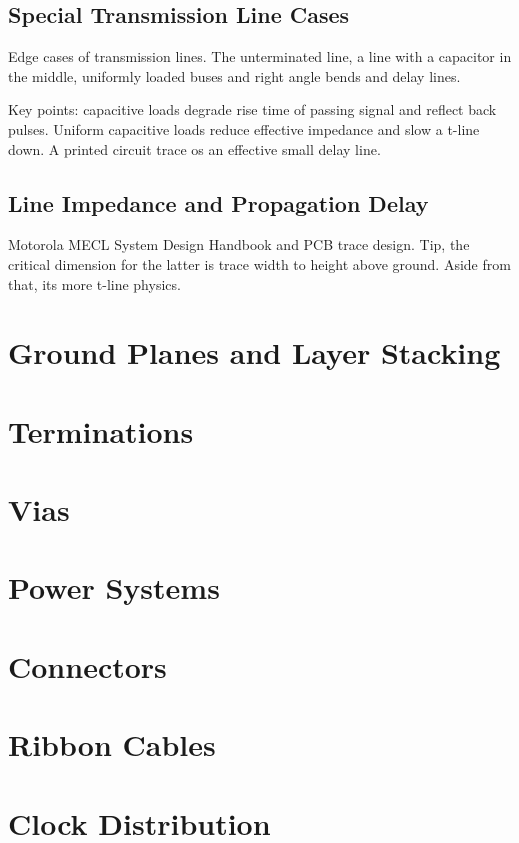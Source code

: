 \documentclass{article}
\begin{document}
	\subsection{Special Transmission Line Cases}
	Edge cases of transmission lines. The unterminated line, a line with a capacitor in the middle, uniformly loaded buses and right angle bends and delay lines.
	
	Key points: capacitive loads degrade rise time of passing signal and reflect back pulses. Uniform capacitive loads reduce effective impedance and slow a t-line down. A printed circuit trace os an effective small delay line.
	\subsection{Line Impedance and Propagation Delay}
	Motorola MECL System Design Handbook and PCB trace design. Tip, the critical dimension for the latter is trace width to height above ground. Aside from that, its more t-line physics.
	
	\section{Ground Planes and Layer Stacking}
	
	\section{Terminations}
	
	\section{Vias}
	
	\section{Power Systems}
	
	\section{Connectors}
		
	\section{Ribbon Cables}
	
	\section{Clock Distribution}
	
\end{document}

